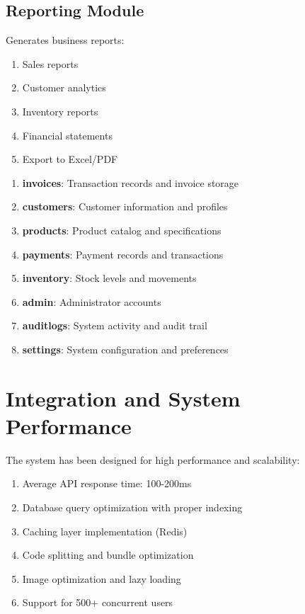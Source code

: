 \documentclass[12pt,a4paper]{report}
\begin{document}
\subsection{Reporting Module}

Generates business reports:

\begin{enumerate}[label=\roman*)]
    \item Sales reports
    \item Customer analytics
    \item Inventory reports
    \item Financial statements
    \item Export to Excel/PDF
\end{enumerate}

\begin{enumerate}[label=\roman*)]
    \item \textbf{invoices}: Transaction records and invoice storage
    \item \textbf{customers}: Customer information and profiles
    \item \textbf{products}: Product catalog and specifications
    \item \textbf{payments}: Payment records and transactions
    \item \textbf{inventory}: Stock levels and movements
    \item \textbf{admin}: Administrator accounts
    \item \textbf{auditlogs}: System activity and audit trail
    \item \textbf{settings}: System configuration and preferences
\end{enumerate}

\newpage

\section{Integration and System Performance}

The system has been designed for high performance and scalability:

\begin{enumerate}[label=\roman*)]
    \item Average API response time: 100-200ms
    \item Database query optimization with proper indexing
    \item Caching layer implementation (Redis)
    \item Code splitting and bundle optimization
    \item Image optimization and lazy loading
    \item Support for 500+ concurrent users
\end{enumerate}
\end{document}

